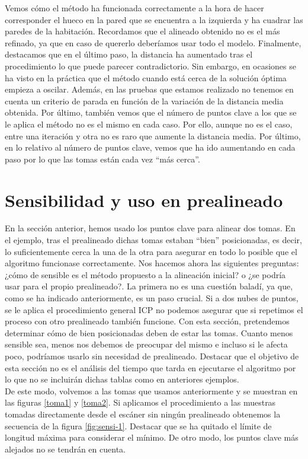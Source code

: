 Vemos cómo el método ha funcionada correctamente a la hora de hacer corresponder el hueco en la pared que se encuentra a la izquierda y ha cuadrar las paredes de la habitación. Recordamos que el alineado obtenido no es el más refinado, ya que en caso de quererlo deberíamos usar todo el modelo. Finalmente, destacamos que en el último paso, la distancia ha aumentado tras el procedimiento lo que puede parecer contradictorio. Sin embargo, en ocasiones se ha visto en la práctica que el método cuando está cerca de la solución óptima empieza a oscilar. Además,  en las pruebas que estamos realizado no tenemos en cuenta un criterio de parada en función de la variación de la distancia media obtenida. Por último, también vemos que el número de puntos clave a los que se le aplica el método no es el mismo en cada caso. Por ello, aunque no es el caso, entre una iteración y otra no es raro que aumente la distancia media. Por último, en lo relativo al número de puntos clave, vemos que ha ido aumentando en cada paso por lo que las tomas están cada vez ``más cerca''.

\section{Sensibilidad y uso en prealineado}
En la sección anterior, hemos usado los puntos clave para alinear dos tomas. En el ejemplo, tras el prealineado dichas tomas estaban ``bien'' posicionadas, es decir, lo suficientemente cerca la una de la otra para asegurar en todo lo posible que el algoritmo funcionase correctamente. Nos hacemos ahora las siguientes preguntas: ¿cómo de sensible es el método propuesto a la alineación inicial? o ¿se podría usar para el propio prealineado?. La primera no es una cuestión baladí, ya que, como se ha indicado anteriormente, es un paso crucial. Si a dos nubes de puntos, se le aplica el procedimiento general ICP no podemos asegurar que si repetimos el proceso con otro prealineado  también funcione. Con esta sección, pretendemos determinar cómo de bien posicionadas deben de estar las tomas. Cuanto menos sensible sea, menos nos debemos de preocupar del mismo e incluso si le afecta poco, podríamos usarlo sin necesidad de prealineado. Destacar que el objetivo de esta sección no es el análisis del tiempo que tarda en ejecutarse el algoritmo por lo que no se incluirán dichas tablas como en anteriores ejemplos.\\

De este modo, volvemos a las tomas que usamos anteriormente y se muestran en las figuras \ref{toma1} y \ref{toma2}. Si aplicamos el procedimiento a las muestras tomadas directamente desde el escáner sin ningún prealineado obtenemos la secuencia de la figura \ref{fig:sensi-1}. Destacar que se ha quitado el límite de longitud máxima para considerar el mínimo. De otro modo, los puntos clave más alejados no se tendrán en cuenta. \\

